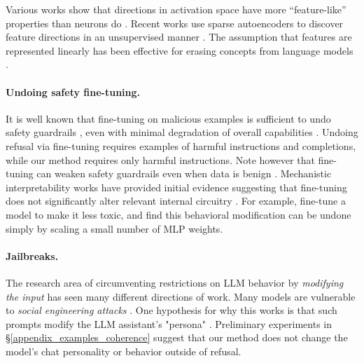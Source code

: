 \documentclass{article}
\begin{document}
Various works show that 
directions in activation space have more ``feature-like'' properties than neurons do \citep{elhage2022superposition, mikolov2013linguistic, park2023linear, li2021implicit, geiger2024finding, hernandez2021low, nanda2023emergent, bolukbasi2016man}.
Recent works use sparse autoencoders to discover feature directions in an unsupervised manner
\citep{bricken2023monosemanticity, cunningham2023sparse, templeton2024scaling}. 
The assumption that features are represented linearly has been effective for erasing concepts from language models  \citep{belrose2024leace, belrose2023diffinmeans, ravfogel2020null, guerner2023geometric, haghighatkhah2022better, shao2022gold}.

\paragraph{Undoing safety fine-tuning.}
It is well known that
fine-tuning on malicious examples is sufficient to undo safety guardrails \citep{lermen2023lora}, even with minimal degradation of overall capabilities \citep{yang2023shadow,zhan2023removing}. 
Undoing refusal via fine-tuning requires examples of harmful instructions and completions, while our method requires only harmful instructions. 
Note however that fine-tuning can weaken safety guardrails even when data is benign \citep{qi2023fine,pelrine2023exploiting}.
%
Mechanistic interpretability works have provided initial evidence suggesting that fine-tuning does not significantly alter relevant internal circuitry \citep{lee2024mechanistic, prakash2024fine, jain2023mechanistically}.
For example, \citet{lee2024mechanistic} fine-tune a model to make it less toxic, and find this behavioral modification can be undone simply by scaling a small number of MLP weights.

\paragraph{Jailbreaks.}
The research area of circumventing restrictions on LLM behavior by \emph{modifying the input} has seen many different directions of work.
Many models are vulnerable to \emph{social engineering attacks} 
\citep{wei2023jailbroken,shah2023scalable,perez2022red}.
One hypothesis for why this works is that such prompts modify the LLM assistant's "persona"
\citep{andreas2022language,shanahan2023role,park2023generative}.
Preliminary experiments in \S\ref{appendix_examples_coherence} suggest that our method does not change the model's chat personality or behavior outside of refusal.
\end{document}
